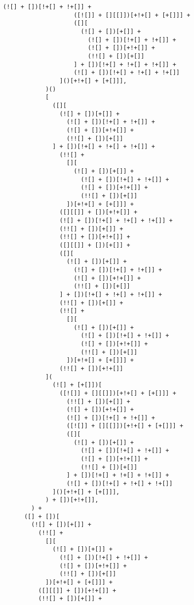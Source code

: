 \begin{lstlisting}[style=basicStyle, caption=alert('XSS') in JSFuck, label={lst:alertxssjsfuck}]
                    (![] + [])[!+[] + !+[]] +
                    ([![]] + [][[]])[+!+[] + [+[]]] +
                    ([][
                      (![] + [])[+[]] +
                        (![] + [])[!+[] + !+[]] +
                        (![] + [])[+!+[]] +
                        (!![] + [])[+[]]
                    ] + [])[!+[] + !+[] + !+[]] +
                    (![] + [])[!+[] + !+[] + !+[]]
                ]()[+!+[] + [+[]]],
            )()
            [
              ([][
                (![] + [])[+[]] +
                  (![] + [])[!+[] + !+[]] +
                  (![] + [])[+!+[]] +
                  (!![] + [])[+[]]
              ] + [])[!+[] + !+[] + !+[]] +
                (!![] +
                  [][
                    (![] + [])[+[]] +
                      (![] + [])[!+[] + !+[]] +
                      (![] + [])[+!+[]] +
                      (!![] + [])[+[]]
                  ])[+!+[] + [+[]]] +
                ([][[]] + [])[+!+[]] +
                (![] + [])[!+[] + !+[] + !+[]] +
                (!![] + [])[+[]] +
                (!![] + [])[+!+[]] +
                ([][[]] + [])[+[]] +
                ([][
                  (![] + [])[+[]] +
                    (![] + [])[!+[] + !+[]] +
                    (![] + [])[+!+[]] +
                    (!![] + [])[+[]]
                ] + [])[!+[] + !+[] + !+[]] +
                (!![] + [])[+[]] +
                (!![] +
                  [][
                    (![] + [])[+[]] +
                      (![] + [])[!+[] + !+[]] +
                      (![] + [])[+!+[]] +
                      (!![] + [])[+[]]
                  ])[+!+[] + [+[]]] +
                (!![] + [])[+!+[]]
            ](
              (![] + [+[]])[
                ([![]] + [][[]])[+!+[] + [+[]]] +
                  (!![] + [])[+[]] +
                  (![] + [])[+!+[]] +
                  (![] + [])[!+[] + !+[]] +
                  ([![]] + [][[]])[+!+[] + [+[]]] +
                  ([][
                    (![] + [])[+[]] +
                      (![] + [])[!+[] + !+[]] +
                      (![] + [])[+!+[]] +
                      (!![] + [])[+[]]
                  ] + [])[!+[] + !+[] + !+[]] +
                  (![] + [])[!+[] + !+[] + !+[]]
              ]()[+!+[] + [+[]]],
            ) + [])[+!+[]],
        ) +
      ([] + [])[
        (![] + [])[+[]] +
          (!![] +
            [][
              (![] + [])[+[]] +
                (![] + [])[!+[] + !+[]] +
                (![] + [])[+!+[]] +
                (!![] + [])[+[]]
            ])[+!+[] + [+[]]] +
          ([][[]] + [])[+!+[]] +
          (!![] + [])[+[]] +

\end{lstlisting}
